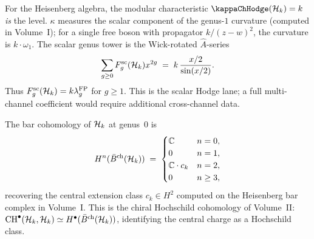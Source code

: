 \begin{remark}
\label{rem:rosetta-kappa-is-k}
For the Heisenberg algebra, the modular characteristic $\kappaChHodge(\cH_k) = k$ \emph{is} the level. $\kappa$ measures the scalar component of the genus-$1$ curvature (computed in Volume~I); for a single free boson with propagator $k/(z - w)^2$, the curvature is $k \cdot \omega_1$. The scalar genus tower is the Wick-rotated $\hat{A}$-series
\begin{equation}\label{eq:rosetta-ahat}
\sum_{g\geq 0}F_g^{\mathrm{sc}}(\mathcal{H}_k)x^{2g}
\;=\;
k\,\frac{x/2}{\sin(x/2)} .
\end{equation}
Thus \(F_g^{\mathrm{sc}}(\mathcal{H}_k)=k\lambda_g^{\mathrm{FP}}\) for
\(g\geq1\).  This is the scalar Hodge lane; a full multi-channel
coefficient would require additional cross-channel data.
\end{remark}

\begin{proposition}
\label{prop:rosetta-bar-hochschild}
The bar cohomology of $\mathcal{H}_k$ at genus~$0$ is
\begin{equation}\label{eq:rosetta-bar-cohomology}
H^n(\bar{B}^{\mathrm{ch}}(\mathcal{H}_k))
\;=\;
\begin{cases}
\mathbb{C} & n = 0, \\
0 & n = 1, \\
\mathbb{C} \cdot c_k & n = 2, \\
0 & n \geq 3,
\end{cases}
\end{equation}
recovering the central extension class $c_k \in H^2$
computed on the Heisenberg bar complex in Volume~I.
This is the chiral Hochschild cohomology of Volume~II:
$\mathrm{CH}^{\bullet}(\mathcal{H}_k, \mathcal{H}_k) \simeq
H^{\bullet}(\bar{B}^{\mathrm{ch}}(\mathcal{H}_k))$, identifying the
central charge as a Hochschild class.
\end{proposition}

